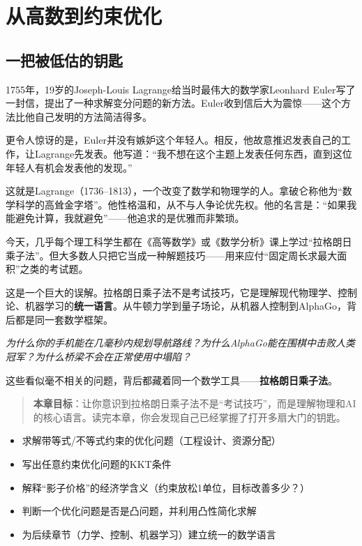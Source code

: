 \chapter{从高数到约束优化}

\section*{一把被低估的钥匙}

1755年，19岁的Joseph-Louis Lagrange给当时最伟大的数学家Leonhard Euler写了一封信，提出了一种求解变分问题的新方法。Euler收到信后大为震惊——这个方法比他自己发明的方法简洁得多。

更令人惊讶的是，Euler并没有嫉妒这个年轻人。相反，他故意推迟发表自己的工作，让Lagrange先发表。他写道：“我不想在这个主题上发表任何东西，直到这位年轻人有机会发表他的发现。”

这就是Lagrange（1736--1813），一个改变了数学和物理学的人。拿破仑称他为“数学科学的高耸金字塔”。他性格温和，从不与人争论优先权。他的名言是：“如果我能避免计算，我就避免”——他追求的是优雅而非繁琐。


今天，几乎每个理工科学生都在《高等数学》或《数学分析》课上学过“拉格朗日乘子法”。但大多数人只把它当成一种解题技巧——用来应付“固定周长求最大面积”之类的考试题。

这是一个巨大的误解。拉格朗日乘子法不是考试技巧，它是理解现代物理学、控制论、机器学习的\textbf{统一语言}。从牛顿力学到量子场论，从机器人控制到AlphaGo，背后都是同一套数学框架。

\vspace{0.5cm}
\noindent\textit{为什么你的手机能在几毫秒内规划导航路线？为什么AlphaGo能在围棋中击败人类冠军？为什么桥梁不会在正常使用中塌陷？}

\vspace{0.3cm}
这些看似毫不相关的问题，背后都藏着同一个数学工具——\textbf{拉格朗日乘子法}。

\begin{quote}
\textbf{本章目标}：让你意识到拉格朗日乘子法不是“考试技巧”，而是理解物理和AI的核心语言。读完本章，你会发现自己已经掌握了打开多扇大门的钥匙。
\end{quote}

\begin{tcolorbox}[colback=green!5, colframe=green!60!black, title=学完这章，你将能够...]
\begin{itemize}
    \item 求解带等式/不等式约束的优化问题（工程设计、资源分配）
    \item 写出任意约束优化问题的KKT条件
    \item 解释“影子价格”的经济学含义（约束放松1单位，目标改善多少？）
    \item 判断一个优化问题是否是凸问题，并利用凸性简化求解
    \item 为后续章节（力学、控制、机器学习）建立统一的数学语言
\end{itemize}
\end{tcolorbox}

